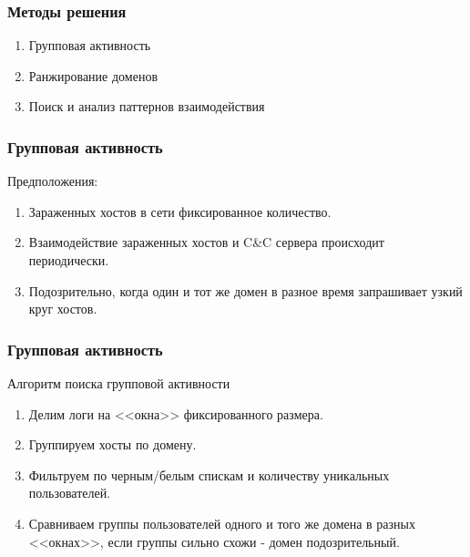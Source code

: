 \documentclass[12pt,pdf,hyperref={unicode}]{beamer}
\newcommand\Fontvi{\fontsize{26}{20}\selectfont}
\begin{document}
\begin{frame}
\Fontvi

\frametitle{Методы решения} 

\begin{center}
\begin{minipage}{.97\textwidth}
\begin{enumerate}

	\item Групповая активность
	\item Ранжирование доменов
	\item Поиск и анализ паттернов взаимодействия

\end{enumerate}
\end{minipage}
\end{center}
\end{frame}
\begin{frame}
\frametitle{Групповая активность}

Предположения:
\begin{enumerate}
	\item Зараженных хостов в сети фиксированное количество.
	\item Взаимодействие зараженных хостов и C\&C сервера происходит периодически.
	\item  Подозрительно, когда один и тот же домен в разное время запрашивает узкий круг хостов.
\end{enumerate}
\end{frame}

\begin{frame}
\frametitle{Групповая активность}
Алгоритм поиска групповой активности
\begin{enumerate}
	\item Делим логи на <<окна>> фиксированного размера.
	\item Группируем хосты по домену.
	\item Фильтруем по черным/белым спискам и количеству уникальных пользователей.
	\item Сравниваем группы пользователей одного и того же домена в разных <<окнах>>, если группы сильно схожи - домен подозрительный.
\end{enumerate}
\end{frame}
\end{document}
